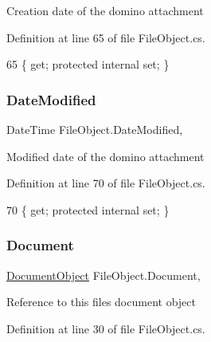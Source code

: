 Creation date of the domino attachment 



Definition at line 65 of file File\+Object.\+cs.


\begin{DoxyCode}
65 \{ \textcolor{keyword}{get}; \textcolor{keyword}{protected} \textcolor{keyword}{internal} \textcolor{keyword}{set}; \}
\end{DoxyCode}
\mbox{\label{class_file_object_a9a4c52e205bee3f8bdfa7040f465b6af}} 
\subsubsection{\texorpdfstring{Date\+Modified}{DateModified}}
{\footnotesize\ttfamily Date\+Time File\+Object.\+Date\+Modified\hspace{0.3cm}{\ttfamily [get]}, {\ttfamily [set]}}



Modified date of the domino attachment 



Definition at line 70 of file File\+Object.\+cs.


\begin{DoxyCode}
70 \{ \textcolor{keyword}{get}; \textcolor{keyword}{protected} \textcolor{keyword}{internal} \textcolor{keyword}{set}; \}
\end{DoxyCode}
\mbox{\label{class_file_object_a0c9650a6ae1efb95f8211f9fa3b883fe}} 
\subsubsection{\texorpdfstring{Document}{Document}}
{\footnotesize\ttfamily \mbox{\hyperlink{class_document_object}{Document\+Object}} File\+Object.\+Document\hspace{0.3cm}{\ttfamily [get]}, {\ttfamily [set]}}



Reference to this files document object 



Definition at line 30 of file File\+Object.\+cs.



